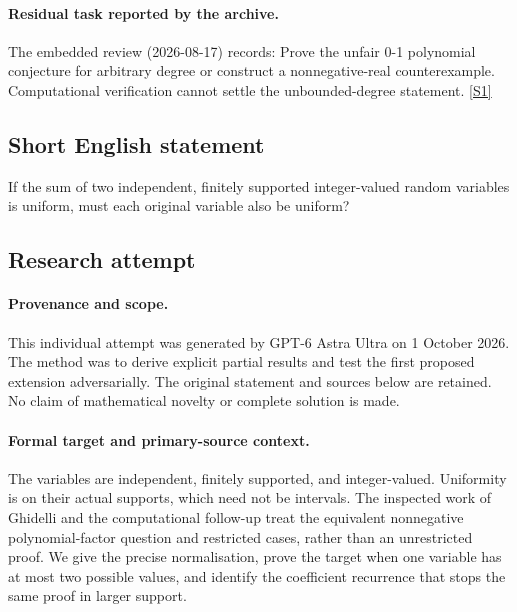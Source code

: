 \documentclass[11pt,a4paper]{article}
\newcommand{\sref}[2]{\hyperlink{source:#1:#2}{[S#2]}}
\begin{document}
\paragraph{Residual task reported by the archive.}

The embedded review (2026-08-17) records: Prove the unfair 0-1 polynomial conjecture for arbitrary degree or construct a nonnegative-real counterexample. Computational verification cannot settle the unbounded-degree statement. \sref{159}{1}

\subsection{Short English statement}

If the sum of two independent, finitely supported integer-valued random variables is uniform, must each original variable also be uniform?

\subsection{Research attempt}

\paragraph{Provenance and scope.}
This individual attempt was generated by GPT-6 Astra Ultra on 1 October 2026. The method was to derive explicit partial results and test the first proposed extension adversarially. The original statement and sources below are retained. No claim of mathematical novelty or complete solution is made.

\paragraph{Formal target and primary-source context.}
The variables are independent, finitely supported, and integer-valued. Uniformity is on their actual supports, which need not be intervals. The inspected work of Ghidelli and the computational follow-up treat the equivalent nonnegative polynomial-factor question and restricted cases, rather than an unrestricted proof. We give the precise normalisation, prove the target when one variable has at most two possible values, and identify the coefficient recurrence that stops the same proof in larger support.
\end{document}
